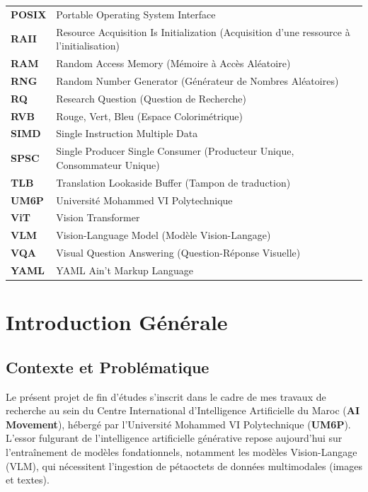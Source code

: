 \documentclass[12pt,a4paper]{report}
\begin{document}
\begin{tabular}{>{\bfseries}ll}
POSIX  & Portable Operating System Interface \\
RAII   & Resource Acquisition Is Initialization (Acquisition d'une ressource à l'initialisation) \\
RAM    & Random Access Memory (Mémoire à Accès Aléatoire) \\
RNG    & Random Number Generator (Générateur de Nombres Aléatoires) \\
RQ     & Research Question (Question de Recherche) \\
RVB    & Rouge, Vert, Bleu (Espace Colorimétrique) \\
SIMD   & Single Instruction Multiple Data \\
SPSC   & Single Producer Single Consumer (Producteur Unique, Consommateur Unique) \\
TLB    & Translation Lookaside Buffer (Tampon de traduction) \\
UM6P   & Université Mohammed VI Polytechnique \\
ViT    & Vision Transformer \\
VLM    & Vision-Language Model (Modèle Vision-Langage) \\
VQA    & Visual Question Answering (Question-Réponse Visuelle) \\
YAML   & YAML Ain't Markup Language \\
\end{tabular}


\newpage
\thispagestyle{empty}
\listoffigures

\newpage
\thispagestyle{empty}
\listoftables


\newpage

\setcounter{page}{1}

\section*{Introduction Générale}

\subsection{Contexte et Problématique}

Le présent projet de fin d'études s'inscrit dans le cadre de mes travaux de recherche au sein du Centre International d'Intelligence Artificielle du Maroc (\textbf{AI Movement}), hébergé par l'Université Mohammed VI Polytechnique (\textbf{UM6P}). L'essor fulgurant de l'intelligence artificielle générative repose aujourd'hui sur l'entraînement de modèles fondationnels, notamment les modèles Vision-Langage (VLM), qui nécessitent l'ingestion de pétaoctets de données multimodales (images et textes).
\end{document}
